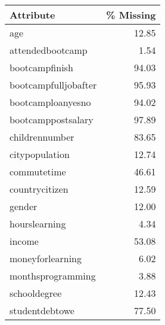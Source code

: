 \begin{tabular}{lr}
\toprule
            \textbf{Attribute} &  \textbf{\% Missing} \\
\midrule
age &      12.85 \\
attendedbootcamp &       1.54 \\
 bootcampfinish &      94.03 \\
 bootcampfulljobafter &      95.93 \\
 bootcamploanyesno &      94.02 \\
 bootcamppostsalary &      97.89 \\
childrennumber &      83.65 \\
citypopulation &      12.74 \\
commutetime &      46.61 \\
countrycitizen &      12.59 \\
gender &      12.00 \\
hourslearning &       4.34 \\
income &      53.08 \\
moneyforlearning &       6.02 \\
monthsprogramming &       3.88 \\
schooldegree &      12.43 \\
studentdebtowe &      77.50 \\
\bottomrule
\end{tabular}
